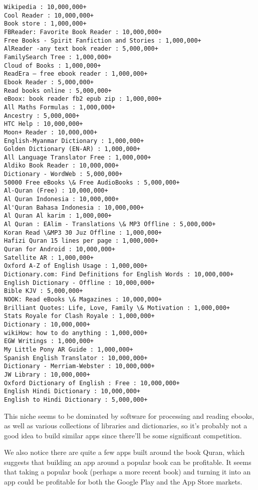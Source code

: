 \documentclass[11pt]{article}
\begin{document}
    \begin{Verbatim}[commandchars=\\\{\}]
Wikipedia : 10,000,000+
Cool Reader : 10,000,000+
Book store : 1,000,000+
FBReader: Favorite Book Reader : 10,000,000+
Free Books - Spirit Fanfiction and Stories : 1,000,000+
AlReader -any text book reader : 5,000,000+
FamilySearch Tree : 1,000,000+
Cloud of Books : 1,000,000+
ReadEra – free ebook reader : 1,000,000+
Ebook Reader : 5,000,000+
Read books online : 5,000,000+
eBoox: book reader fb2 epub zip : 1,000,000+
All Maths Formulas : 1,000,000+
Ancestry : 5,000,000+
HTC Help : 10,000,000+
Moon+ Reader : 10,000,000+
English-Myanmar Dictionary : 1,000,000+
Golden Dictionary (EN-AR) : 1,000,000+
All Language Translator Free : 1,000,000+
Aldiko Book Reader : 10,000,000+
Dictionary - WordWeb : 5,000,000+
50000 Free eBooks \& Free AudioBooks : 5,000,000+
Al-Quran (Free) : 10,000,000+
Al Quran Indonesia : 10,000,000+
Al'Quran Bahasa Indonesia : 10,000,000+
Al Quran Al karim : 1,000,000+
Al Quran : EAlim - Translations \& MP3 Offline : 5,000,000+
Koran Read \&MP3 30 Juz Offline : 1,000,000+
Hafizi Quran 15 lines per page : 1,000,000+
Quran for Android : 10,000,000+
Satellite AR : 1,000,000+
Oxford A-Z of English Usage : 1,000,000+
Dictionary.com: Find Definitions for English Words : 10,000,000+
English Dictionary - Offline : 10,000,000+
Bible KJV : 5,000,000+
NOOK: Read eBooks \& Magazines : 10,000,000+
Brilliant Quotes: Life, Love, Family \& Motivation : 1,000,000+
Stats Royale for Clash Royale : 1,000,000+
Dictionary : 10,000,000+
wikiHow: how to do anything : 1,000,000+
EGW Writings : 1,000,000+
My Little Pony AR Guide : 1,000,000+
Spanish English Translator : 10,000,000+
Dictionary - Merriam-Webster : 10,000,000+
JW Library : 10,000,000+
Oxford Dictionary of English : Free : 10,000,000+
English Hindi Dictionary : 10,000,000+
English to Hindi Dictionary : 5,000,000+

    \end{Verbatim}

    This niche seems to be dominated by software for processing and reading
ebooks, as well as various collections of libraries and dictionaries, so
it's probably not a good idea to build similar apps since there'll be
some significant competition.

    We also notice there are quite a few apps built around the book Quran,
which suggests that building an app around a popular book can be
profitable. It seems that taking a popular book (perhaps a more recent
book) and turning it into an app could be profitable for both the Google
Play and the App Store markets.
\end{document}

